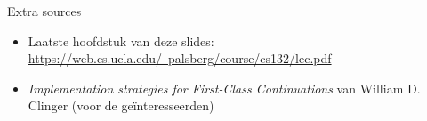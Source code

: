 \documentclass{beamer}
\begin{document}
\begin{frame}{Extra sources}
	\begin{itemize}
	    \item Laatste hoofdstuk van deze slides: \href{https://web.cs.ucla.edu/~palsberg/course/cs132/lec.pdf}{https://web.cs.ucla.edu/~palsberg/course/cs132/lec.pdf}
	    \item \emph{Implementation strategies for First-Class Continuations} van William D. Clinger (voor de geïnteresseerden)
	\end{itemize}
\end{frame}
\end{document}
